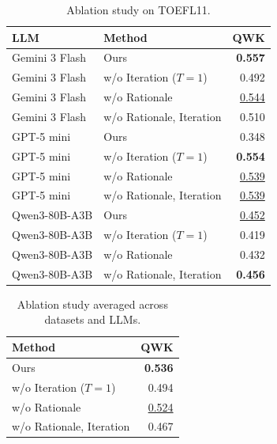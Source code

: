 \begin{table}[t]
\centering
\small
\caption{Ablation study on TOEFL11.}
\begin{tabular}{llr}
\toprule
LLM & Method & QWK \\
\midrule
Gemini 3 Flash & Ours & \textbf{0.557} \\
Gemini 3 Flash & w/o Iteration ($T=1$) & 0.492 \\
Gemini 3 Flash & w/o Rationale & \underline{0.544} \\
Gemini 3 Flash & w/o Rationale, Iteration & 0.510 \\
\midrule
GPT-5 mini & Ours & 0.348 \\
GPT-5 mini & w/o Iteration ($T=1$) & \textbf{0.554} \\
GPT-5 mini & w/o Rationale & \underline{0.539} \\
GPT-5 mini & w/o Rationale, Iteration & \underline{0.539} \\
\midrule
Qwen3-80B-A3B & Ours & \underline{0.452} \\
Qwen3-80B-A3B & w/o Iteration ($T=1$) & 0.419 \\
Qwen3-80B-A3B & w/o Rationale & 0.432 \\
Qwen3-80B-A3B & w/o Rationale, Iteration & \textbf{0.456} \\
\bottomrule
\end{tabular}
\end{table}

\begin{table}[t]
\centering
\small
\caption{Ablation study averaged across datasets and LLMs.}
\begin{tabular}{lr}
\toprule
Method & QWK \\
\midrule
Ours & \textbf{0.536} \\
w/o Iteration ($T=1$) & 0.494 \\
w/o Rationale & \underline{0.524} \\
w/o Rationale, Iteration & 0.467 \\
\bottomrule
\end{tabular}
\end{table}
